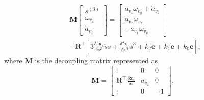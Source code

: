 
\begin{equation}
\begin{split}
& \mathbf{M}
\begin{bmatrix}
s^{(3)} \\
\omega_{v_x} \\
\dot{a}_{v_z}
\end{bmatrix} = 
\begin{bmatrix}
a_{v_z}\omega_{v_y} + \dot{a}_{v_z}\\
a_{v_x}\omega_{v_z} \\
-a_{v_x}\omega_{v_y}
\end{bmatrix} \\
 &- 
\mathbf{R}^\top \left[3\frac{\delta^2\mathbf{x}_{r}}{\delta s^2}\ddot{s}\dot{s} + \frac{\delta^3\mathbf{x}_{r}}{\delta s^3}\dot{s}^3 + k_2\mathbf{\dddot{e}} + k_1\mathbf{\dot{e}} + k_0\mathbf{e}\right],
\end{split}
\label{eq:time_param_differential_flatness}
\end{equation}
where $\mathbf{M}$ is the decoupling matrix represented as
\begin{equation}
\mathbf{M}
 = 
\begin{bmatrix}
\vdots & 0 & 0\\
\mathbf{R}^\top\frac{\delta\mathbf{x}_{r}}{\delta s}& a_{v_z} & 0 \\
\vdots & 0 & -1
\end{bmatrix}. 
\label{eq:time_param_M}
\end{equation} 


